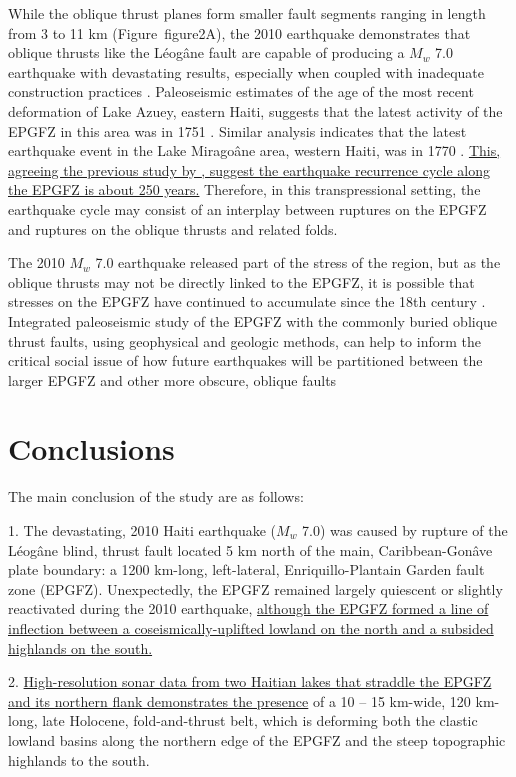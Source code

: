 \documentclass[linenumbers,draft]{agujournal}
\begin{document}
While the oblique thrust planes form smaller fault segments ranging in length from 3 to 11 km (Figure~{figure2}A), the 2010 earthquake demonstrates that oblique thrusts like the L\'eog\^ane fault are capable of producing a $M_w$ 7.0 earthquake with devastating results, especially when coupled with inadequate construction practices \citep{symithe2016present}. Paleoseismic estimates of the age of the most recent deformation of Lake Azuey, eastern Haiti, suggests that the latest activity of the EPGFZ in this area was in 1751 \citep{prentice2010seismic,bakun2012significant}. Similar analysis indicates that the latest earthquake event in the Lake Mirago\^ane area, western Haiti, was in 1770 \citep{bakun2012significant}. \ul{This, agreeing the previous study by }\underline{\citet{bakun2012significant},}\ul{ suggest the earthquake recurrence cycle along the EPGFZ is about 250 years.} Therefore, in this transpressional setting, the earthquake cycle may consist of an interplay between ruptures on the EPGFZ and ruptures on the oblique thrusts and related folds. 

The 2010 $M_w$ 7.0 earthquake released part of the stress of the region, but as the oblique thrusts may not be directly linked to the EPGFZ, it is possible that stresses on the EPGFZ have continued to accumulate since the 18th century \citep{prentice2010seismic}. Integrated paleoseismic study of the EPGFZ with the commonly buried oblique thrust faults, using geophysical and geologic methods, can help to inform the critical social issue of how future earthquakes will be partitioned between the larger EPGFZ and other more obscure, oblique faults

\section{Conclusions}
The main conclusion of the study are as follows: 

1. The devastating, 2010 Haiti earthquake ($M_w$ 7.0) was caused by rupture of the L\'eog\^ane blind, thrust fault located 5 km north of the main, Caribbean-Gon\^ave plate boundary: a 1200 km-long, left-lateral, Enriquillo-Plantain Garden fault zone (EPGFZ). Unexpectedly, the EPGFZ remained largely quiescent or slightly reactivated during the 2010 earthquake, \ul{although the EPGFZ formed a line of inflection between a coseismically-uplifted lowland on the north and a subsided highlands on the south.} 

2. \ul{High-resolution sonar data from two Haitian lakes that straddle the EPGFZ and its northern flank demonstrates the presence} of a 10 -- 15 km-wide, 120 km-long, late Holocene, fold-and-thrust belt, which is deforming both the clastic lowland basins along the northern edge of the EPGFZ and the steep topographic highlands to the south. 
\end{document}
